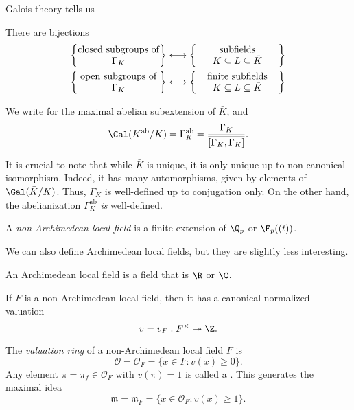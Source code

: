 \documentclass[a4paper]{article}
\newcommand\ab{\mathrm{ab}}
\begin{document}
Galois theory tells us
\begin{thm}
  There are bijections
  \begin{align*}
    \left\{\parbox{3cm}{\centering closed subgroups of $\Gamma_K$}\right\} &\longleftrightarrow \left\{\parbox{3cm}{\centering subfields $K \subseteq L \subseteq \bar{K}$}\right\}\\
    \left\{\parbox{3cm}{\centering open subgroups of $\Gamma_K$}\right\} &\longleftrightarrow \left\{\parbox{3cm}{\centering finite subfields $K \subseteq L \subseteq \bar{K}$}\right\}
  \end{align*}
\end{thm}

\begin{notation}
  We write \term{$K^{\ab}$} for the maximal abelian subextension of $\bar{K}$, and
  \[
    \Gal(K^{\ab}/K) = \Gamma_K^{\ab} = \frac{\Gamma_K}{\overline{[\Gamma_K, \Gamma_K]}}.
  \]
\end{notation}
It is crucial to note that while $\bar{K}$ is unique, it is only unique up to non-canonical isomorphism. Indeed, it has many automorphisms, given by elements of $\Gal(\bar{K}/K)$. Thus, $\Gamma_K$ is well-defined up to conjugation only. On the other hand, the abelianization $\Gamma_K^{\ab}$ \emph{is} well-defined.

\begin{defi}
  A \emph{non-Archimedean local field} is a finite extension of $\Q_p$ or $\F_p((t))$.
\end{defi}
We can also define Archimedean local fields, but they are slightly less interesting.
\begin{defi}
  An Archimedean local field is a field that is $\R$ or $\C$.
\end{defi}

If $F$ is a non-Archimedean local field, then it has a canonical normalized valuation
\[
  v = v_F: F^\times \twoheadrightarrow \Z.
\]
\begin{defi}
  The \emph{valuation ring} of a non-Archimedean local field $F$ is
  \[
    \mathcal{O} = \mathcal{O}_F = \{x \in F : v(x) \geq 0\}.
  \]
  Any element $\pi = \pi_f \in \mathcal{O}_F$ with $v(\pi) = 1$ is called a . This generates the maximal idea
  \[
    \mathfrak{m} = \mathfrak{m}_F = \{x \in \mathcal{O}_F: v(x) \geq 1\}.
  \]
\end{defi}
\end{document}
